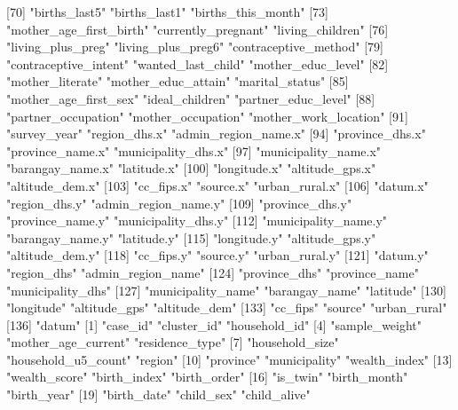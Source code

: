  [70] "births_last5"              "births_last1"              "births_this_month"        
 [73] "mother_age_first_birth"    "currently_pregnant"        "living_children"          
 [76] "living_plus_preg"          "living_plus_preg6"         "contraceptive_method"     
 [79] "contraceptive_intent"      "wanted_last_child"         "mother_educ_level"        
 [82] "mother_literate"           "mother_educ_attain"        "marital_status"           
 [85] "mother_age_first_sex"      "ideal_children"            "partner_educ_level"       
 [88] "partner_occupation"        "mother_occupation"         "mother_work_location"     
 [91] "survey_year"               "region_dhs.x"              "admin_region_name.x"      
 [94] "province_dhs.x"            "province_name.x"           "municipality_dhs.x"       
 [97] "municipality_name.x"       "barangay_name.x"           "latitude.x"               
[100] "longitude.x"               "altitude_gps.x"            "altitude_dem.x"           
[103] "cc_fips.x"                 "source.x"                  "urban_rural.x"            
[106] "datum.x"                   "region_dhs.y"              "admin_region_name.y"      
[109] "province_dhs.y"            "province_name.y"           "municipality_dhs.y"       
[112] "municipality_name.y"       "barangay_name.y"           "latitude.y"               
[115] "longitude.y"               "altitude_gps.y"            "altitude_dem.y"           
[118] "cc_fips.y"                 "source.y"                  "urban_rural.y"            
[121] "datum.y"                   "region_dhs"                "admin_region_name"        
[124] "province_dhs"              "province_name"             "municipality_dhs"         
[127] "municipality_name"         "barangay_name"             "latitude"                 
[130] "longitude"                 "altitude_gps"              "altitude_dem"             
[133] "cc_fips"                   "source"                    "urban_rural"              
[136] "datum"                    
  [1] "case_id"                   "cluster_id"                "household_id"             
  [4] "sample_weight"             "mother_age_current"        "residence_type"           
  [7] "household_size"            "household_u5_count"        "region"                   
 [10] "province"                  "municipality"              "wealth_index"             
 [13] "wealth_score"              "birth_index"               "birth_order"              
 [16] "is_twin"                   "birth_month"               "birth_year"               
 [19] "birth_date"                "child_sex"                 "child_alive"              
